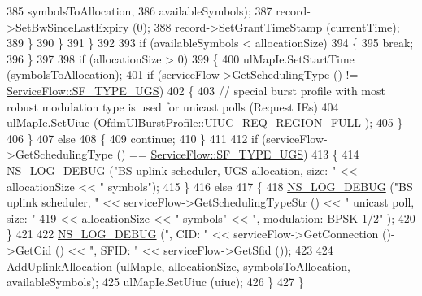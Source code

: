 \begin{DoxyCode}
385                                             symbolsToAllocation,
386                                             availableSymbols);
387                   record->SetBwSinceLastExpiry (0);
388                   record->SetGrantTimeStamp (currentTime);
389                 \}
390             \}
391         \}
392 
393       \textcolor{keywordflow}{if} (availableSymbols < allocationSize)
394         \{
395           \textcolor{keywordflow}{break};
396         \}
397 
398       \textcolor{keywordflow}{if} (allocationSize > 0)
399         \{
400           ulMapIe.SetStartTime (symbolsToAllocation);
401           \textcolor{keywordflow}{if} (serviceFlow->GetSchedulingType () != \hyperlink{classns3_1_1ServiceFlow_a7990ba10be1e098328fd1e6382a26235a969e0b62fa12fef1dbb23913744ed594}{ServiceFlow::SF\_TYPE\_UGS})
402             \{
403               \textcolor{comment}{// special burst profile with most robust modulation type is used for unicast polls (Request
       IEs)}
404               ulMapIe.SetUiuc (\hyperlink{classns3_1_1OfdmUlBurstProfile_ae528783c4b3c6700ff49dfd7a555cb3daae074d10caa7fe18da973227c7f9942f}{OfdmUlBurstProfile::UIUC\_REQ\_REGION\_FULL}
      );
405             \}
406         \}
407       \textcolor{keywordflow}{else}
408         \{
409           \textcolor{keywordflow}{continue};
410         \}
411 
412       \textcolor{keywordflow}{if} (serviceFlow->GetSchedulingType () == \hyperlink{classns3_1_1ServiceFlow_a7990ba10be1e098328fd1e6382a26235a969e0b62fa12fef1dbb23913744ed594}{ServiceFlow::SF\_TYPE\_UGS})
413         \{
414           \hyperlink{group__logging_ga413f1886406d49f59a6a0a89b77b4d0a}{NS\_LOG\_DEBUG} (\textcolor{stringliteral}{"BS uplink scheduler, UGS allocation, size: "} << allocationSize << \textcolor{stringliteral}{"
       symbols"});
415         \}
416       \textcolor{keywordflow}{else}
417         \{
418           \hyperlink{group__logging_ga413f1886406d49f59a6a0a89b77b4d0a}{NS\_LOG\_DEBUG} (\textcolor{stringliteral}{"BS uplink scheduler, "} << serviceFlow->GetSchedulingTypeStr () << \textcolor{stringliteral}{"
       unicast poll, size: "}
419                                                 << allocationSize << \textcolor{stringliteral}{" symbols"} << \textcolor{stringliteral}{", modulation: BPSK 1/2"}
      );
420         \}
421 
422       \hyperlink{group__logging_ga413f1886406d49f59a6a0a89b77b4d0a}{NS\_LOG\_DEBUG} (\textcolor{stringliteral}{", CID: "} << serviceFlow->GetConnection ()->GetCid () << \textcolor{stringliteral}{", SFID: "} << 
      serviceFlow->GetSfid ());
423 
424       \hyperlink{classns3_1_1UplinkSchedulerRtps_aea8d8f5701bf3b5f992d1b43471340d2}{AddUplinkAllocation} (ulMapIe, allocationSize, symbolsToAllocation, 
      availableSymbols);
425       ulMapIe.SetUiuc (uiuc);
426     \}
427 \}
\end{DoxyCode}


